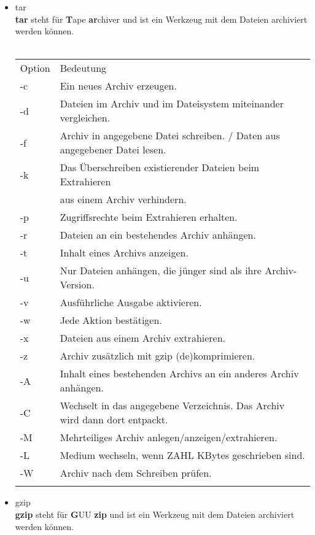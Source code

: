 \begin{itemize}
\begin{tabular}{ll}
			\end{tabular}
			\newpage
			\item tar\\
			\textbf{tar} steht f\"ur \textbf{T}ape \textbf{ar}chiver und ist ein Werkzeug mit dem Dateien archiviert werden k\"onnen.\\ \\
			\begin{tabular}{ll}
				Option & Bedeutung \\
				-c & Ein neues Archiv erzeugen.\\
				-d & Dateien im Archiv und im Dateisystem miteinander vergleichen.\\
				-f & Archiv in angegebene Datei schreiben. / Daten aus angegebener Datei lesen.\\
				-k & Das \"Uberschreiben existierender Dateien beim Extrahieren\\
				& aus einem Archiv verhindern.\\
				-p & Zugriffsrechte beim Extrahieren erhalten.\\
				-r & Dateien an ein bestehendes Archiv anh\"angen.\\
				-t & Inhalt eines Archivs anzeigen.\\
				-u & Nur Dateien anh\"angen, die jünger sind als ihre Archiv-Version.\\
				-v & Ausf\"uhrliche Ausgabe aktivieren.\\
				-w & Jede Aktion best\"atigen.\\
				-x & Dateien aus einem Archiv extrahieren.\\
				-z & Archiv zus\"atzlich mit gzip (de)komprimieren.\\
				-A & Inhalt eines bestehenden Archivs an ein anderes Archiv anh\"angen.\\
				-C & Wechselt in das angegebene Verzeichnis. Das Archiv wird dann dort entpackt.\\
				-M & Mehrteiliges Archiv anlegen/anzeigen/extrahieren.\\
				-L & Medium wechseln, wenn ZAHL KBytes geschrieben sind.\\
				-W & Archiv nach dem Schreiben pr\"ufen.\\ \\ 
			\end{tabular}
			\item gzip\\
			\textbf{gzip} steht f\"ur \textbf{G}UU \textbf{zip} und ist ein Werkzeug mit dem Dateien archiviert werden k\"onnen.\\ \\

\end{itemize}
